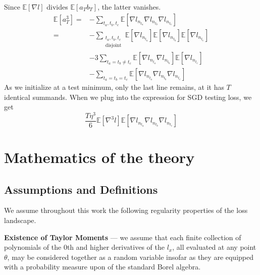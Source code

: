 \documentclass[final,12pt]{colt2021} %
\newcommand{\expct}[1]{\mathbb{E}\left[#1\right]}
\begin{document}
            \newpage
            \begin{shaded}
                Since $\expct{\nabla l}$ divides $\expct{a_T b_T}$, the latter
                vanishes.
                \begin{align*}
                    \expct{a_T^3}
                        =&- \sum_{t_a, t_b, t_c}
                                \expct{\nabla l_{n_{t_a}} \nabla l_{n_{t_b}} \nabla l_{n_{t_c}}}
                        \\
                        =&- \sum_{\substack{t_a, t_b, t_c\\ \text{disjoint}}}  
                                \expct{\nabla l_{n_{t_a}}} \expct{\nabla l_{n_{t_b}}} \expct{\nabla l_{n_{t_c}}}
                        \\&-3 \sum_{t_a=t_b\neq t_c}  
                                \expct{\nabla l_{n_{t_a}} \nabla l_{n_{t_b}}} \expct{\nabla l_{n_{t_c}}}
                        \\&-\sum_{t_a=t_b=t_c}  
                                \expct{\nabla l_{n_{t_a}} \nabla l_{n_{t_b}} \nabla l_{n_{t_c}}}
                \end{align*}
                As we initialize at a test minimum, only the last line remains, at
                it has $T$ identical summands.
                When we plug into the expression for SGD testing loss, we get
                $$
                    \frac{T \eta^3 }{6}
                    \expct{\nabla^3 l}
                    \expct{\nabla l_{n_{t_a}} \nabla l_{n_{t_b}} \nabla l_{n_{t_c}}}
                $$
            \end{shaded}




\newpage
\section{Mathematics of the theory}\label{appendix:math}
    \subsection{Assumptions and Definitions}                        \label{appendix:assumptions}
        We assume throughout this work the following regularity properties of
        the loss landscape.
        
        \textbf{Existence of Taylor Moments} --- we assume
        that each finite collection of polynomials of the $0$th and higher
        derivatives of the $l_x$, all evaluated at any point $\theta$, may be
        considered together as a random variable insofar as they are equipped
        with a probability measure upon of the standard Borel algebra.
\end{document}
